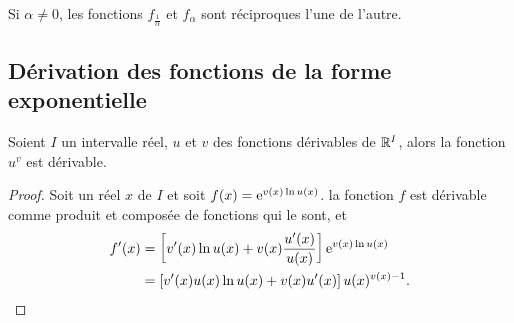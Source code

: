Si $\alpha \neq 0$, les fonctions $f_{\frac{1}{\alpha}}$ et $f_\alpha$ sont réciproques l'une de l'autre.
%
\subsection{Dérivation des fonctions de la forme exponentielle}
\label{subsec:chap1-derivationdesfonctionsdelaformeexponentielle}
\begin{prop} 
  Soient $I$ un intervalle réel, $u$ et $v$ des fonctions dérivables de $\mathbb{R}^{I}$, alors la fonction $u^v$ est dérivable. 
\end{prop}
\begin{proof} 
  Soit un réel $x$ de $I$ et soit $f(x)=\operatorname{e}^{v(x) \ln u(x)}$. la fonction $f$ est dérivable comme produit et composée de fonctions qui le sont, et
  \begin{align} 
    f'(x) &=\left[ v'(x) \ln u(x) + v(x) \frac{u'(x)}{u(x)} \right]\operatorname{e}^{v(x) \ln u(x)} \\
    &= \left[v'(x)u(x)\ln u(x) + v(x) u'(x) \right]u(x)^{v(x)-1}.
  \end{align}
\end{proof}
%
